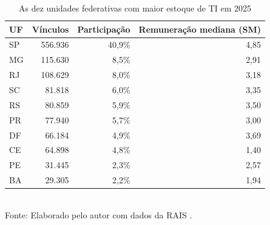 \begin{table}[htbp]
    \centering
    \caption{As dez unidades federativas com maior estoque de TI em 2025}
    \label{tab:uf}
    \footnotesize
    \renewcommand{\arraystretch}{1.25}
    \begin{tabular}{lrrr}
        \toprule
        \rowcolor{black!8}
        \textbf{UF} & \textbf{Vínculos} & \textbf{Participação} & \textbf{Remuneração mediana (SM)} \\
        \midrule
        SP & 556.936 & 40,9\% & 4,85 \\
        MG & 115.630 & 8,5\% & 2,91 \\
        RJ & 108.629 & 8,0\% & 3,18 \\
        SC & 81.818 & 6,0\% & 3,35 \\
        RS & 80.859 & 5,9\% & 3,50 \\
        PR & 77.940 & 5,7\% & 3,00 \\
        DF & 66.184 & 4,9\% & 3,69 \\
        CE & 64.898 & 4,8\% & 1,40 \\
        PE & 31.445 & 2,3\% & 2,57 \\
        BA & 29.305 & 2,2\% & 1,94 \\
        \bottomrule
    \end{tabular}
    \\[4pt]
    Fonte: Elaborado pelo autor com dados da RAIS \cite{RAIS2024}.
\end{table}
